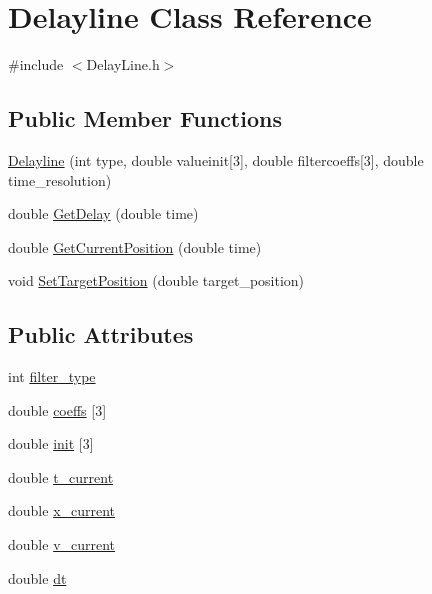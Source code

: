 \hypertarget{classDelayline}{
\section{Delayline Class Reference}
\label{classDelayline}
}


{\ttfamily \#include $<$DelayLine.h$>$}

\subsection*{Public Member Functions}
\begin{DoxyCompactItemize}
\item 
\hyperlink{classDelayline_a4f150b5cc20cf2b07edc73f567e67b6a}{Delayline} (int type, double valueinit\mbox{[}3\mbox{]}, double filtercoeffs\mbox{[}3\mbox{]}, double time\_\-resolution)
\item 
double \hyperlink{classDelayline_ac42a46567eff7c08d9407eec9d6d67eb}{GetDelay} (double time)
\item 
double \hyperlink{classDelayline_ad1078e7e31e7a122426bf8657f6c2ebd}{GetCurrentPosition} (double time)
\item 
void \hyperlink{classDelayline_a82a38ed6acf042f38e88e88b72fa3727}{SetTargetPosition} (double target\_\-position)
\end{DoxyCompactItemize}
\subsection*{Public Attributes}
\begin{DoxyCompactItemize}
\item 
int \hyperlink{classDelayline_afe468350e80620d5e9c7b4e3d06fc7b4}{filter\_\-type}
\item 
double \hyperlink{classDelayline_a2e8e2f168514fb31cea5add2f67a3b45}{coeffs} \mbox{[}3\mbox{]}
\item 
double \hyperlink{classDelayline_ac9ec3daf7cd4e0f152fadddad4ca2f8b}{init} \mbox{[}3\mbox{]}
\item 
double \hyperlink{classDelayline_accecb3d6c35e2849d52531b0cb84b84d}{t\_\-current}
\item 
double \hyperlink{classDelayline_a4ea0c2cd99e17d74551bf76056095925}{x\_\-current}
\item 
double \hyperlink{classDelayline_a3f63bda7a455b53ab1be0e98bea2e1ae}{v\_\-current}
\item 
double \hyperlink{classDelayline_a3559d3ee05f1d543b499f79c75214ef7}{dt}
\end{DoxyCompactItemize}


